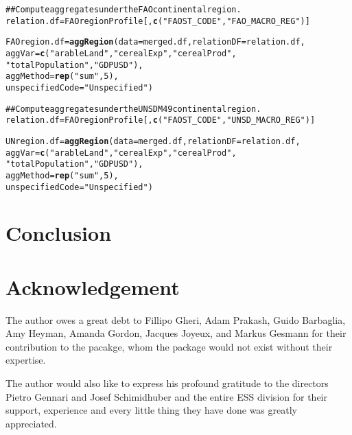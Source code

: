 \documentclass[nojss]{jss}\usepackage{graphicx, color}
\makeatletter
\newcommand{\hlfunctioncall}[1]{\textcolor[rgb]{0.501960784313725,0,0.329411764705882}{\textbf{#1}}}%
\newcommand{\hlstring}[1]{\textcolor[rgb]{0.6,0.6,1}{#1}}%
\newcommand{\hlcomment}[1]{\textcolor[rgb]{0.180392156862745,0.6,0.341176470588235}{#1}}%
\newenvironment{kframe}{%
 \def\at@end@of@kframe{}%
 \ifinner\ifhmode%
  \def\at@end@of@kframe{\end{minipage}}%
  \begin{minipage}{\columnwidth}%
 \fi\fi%
 \def\FrameCommand##1{\hskip\@totalleftmargin \hskip-\fboxsep
 \colorbox{shadecolor}{##1}\hskip-\fboxsep
     \hskip-\linewidth \hskip-\@totalleftmargin \hskip\columnwidth}%
 \MakeFramed {\advance\hsize-\width
   \@totalleftmargin\z@ \linewidth\hsize
   \@setminipage}}%
 {\par\unskip\endMakeFramed%
 \at@end@of@kframe}
\newenvironment{knitrout}{}{} %
\makeatother
\begin{document}
\begin{knitrout}
\color{fgcolor}\begin{kframe}
\begin{alltt}
\hlcomment{## Compute aggregates under the FAO continental region.}
relation.df = FAOregionProfile[, \hlfunctioncall{c}(\hlstring{"FAOST_CODE"}, \hlstring{"FAO_MACRO_REG"})]

FAOregion.df = \hlfunctioncall{aggRegion}(data = merged.df, relationDF = relation.df,
                         aggVar = \hlfunctioncall{c}(\hlstring{"arableLand"}, \hlstring{"cerealExp"}, \hlstring{"cerealProd"},
                                    \hlstring{"totalPopulation"}, \hlstring{"GDPUSD"}),
                         aggMethod = \hlfunctioncall{rep}(\hlstring{"sum"}, 5),
                         unspecifiedCode = \hlstring{"Unspecified"})

\hlcomment{## Compute aggregates under the UNSD M49 continental region.}
relation.df = FAOregionProfile[, \hlfunctioncall{c}(\hlstring{"FAOST_CODE"}, \hlstring{"UNSD_MACRO_REG"})]

UNregion.df = \hlfunctioncall{aggRegion}(data = merged.df, relationDF = relation.df,
                        aggVar = \hlfunctioncall{c}(\hlstring{"arableLand"}, \hlstring{"cerealExp"}, \hlstring{"cerealProd"},
                                   \hlstring{"totalPopulation"}, \hlstring{"GDPUSD"}),
                        aggMethod = \hlfunctioncall{rep}(\hlstring{"sum"}, 5),
                        unspecifiedCode = \hlstring{"Unspecified"})

\end{alltt}
\end{kframe}
\end{knitrout}


\section{Conclusion}




\section*{Acknowledgement}
The author owes a great debt to Fillipo Gheri, Adam Prakash, Guido
Barbaglia, Amy Heyman, Amanda Gordon, Jacques Joyeux, and Markus
Gesmann for their contribution to the pacakge, whom the package would
not exist without their expertise.

The author would also like to express his profound gratitude to the
directors Pietro Gennari and Josef Schimidhuber and the entire ESS
division for their support, experience and every little thing they
have done was greatly appreciated.





\end{document}
